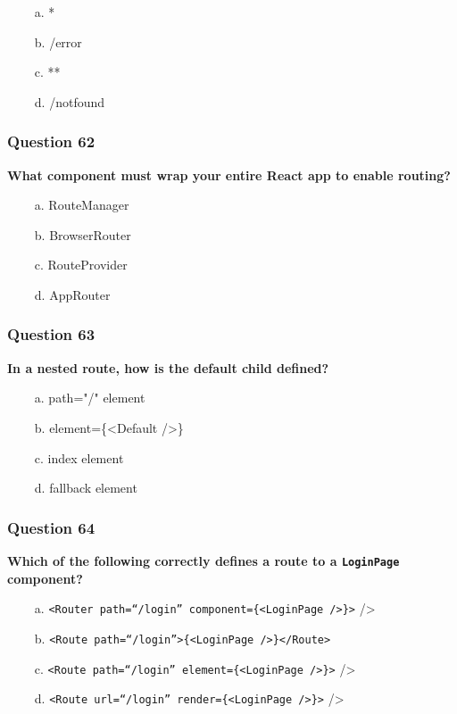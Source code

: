 \documentclass{article}
\newcommand{\cmark}{\textcolor{green}{\ding{51}}} %
\newcommand{\xmark}{\textcolor{red}{\ding{55}}}   %
\begin{document}
\begin{itemize}
  \item[\cmark\ a.] *
  \item[\xmark\ b.] /error
  \item[\xmark\ c.] **
  \item[\xmark\ d.] /notfound
\end{itemize}

\subsubsection*{Question 62}
\textbf{What component must wrap your entire React app to enable routing?}

\begin{itemize}
  \item[\xmark\ a.] RouteManager
  \item[\cmark\ b.] BrowserRouter
  \item[\xmark\ c.] RouteProvider
  \item[\xmark\ d.] AppRouter
\end{itemize}

\subsubsection*{Question 63}
\textbf{In a nested route, how is the default child defined?}

\begin{itemize}
  \item[\xmark\ a.] path="/" element
  \item[\xmark\ b.] element=\{\textless Default /\textgreater\}
  \item[\cmark\ c.] index element
  \item[\xmark\ d.] fallback element
\end{itemize}

\subsubsection*{Question 64}
\textbf{Which of the following correctly defines a route to a \texttt{LoginPage} component?}

\begin{itemize}
  \item[\xmark\ a.] \texttt{<Router path=``/login'' component=\{<LoginPage />\}>} />
  \item[\xmark\ b.] \texttt{<Route path=``/login''>\{<LoginPage />\}</Route>}
  \item[\cmark\ c.] \texttt{<Route path=``/login'' element=\{<LoginPage />\}>} />
  \item[\xmark\ d.] \texttt{<Route url=``/login'' render=\{<LoginPage />\}>} />
\end{itemize}
\end{document}
